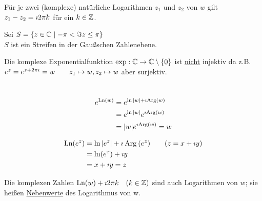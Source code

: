 Für je zwei (komplexe) natürliche Logarithmen $z_1$ und $z_2$ von $w$ gilt $z_1-z_2=\imath 2\pi k$ für ein $k\in\mathbb{Z}$.

Sei $S=\{z\in\mathbb{C}\mid-\pi<\Im z \leq \pi\}$\\
$S$ ist ein Streifen in der Gaußschen Zahlenebene.

\vspace{-0.5cm}

Die komplexe Exponentialfunktion $\exp:\mathbb{C}\to\mathbb{C}\setminus\{0\}$ ist \underline{nicht} injektiv da z.B. $e^z= e^{z+2\pi \imath }=w\qquad z_1\mapsto w, z_2\mapsto w$ aber surjektiv.


\Beweis\quad\\
\begin{align*}
e^{\mathbin\text{Ln}(w)}&=e^{\ln|w|+\imath \mathbin\text{Arg}(w)}\\
&=e^{\ln|w|}e^{\imath \mathbin\text{Arg}(w)}\\
&=|w|e^{\imath \mathbin\text{Arg}(w)}=w
\end{align*}


\begin{align*}
\mathbin\text{Ln}(e^z)&=\ln|e^z|+\imath \mathbin\text{Arg}(e^z)\qquad(z=x+\imath y)\\
&=\ln(e^x)+\imath y\\
&=x+\imath y=z
\end{align*}

\Bem Die komplexen Zahlen $\mathbin\text{Ln}(w)+\imath 2\pi k\quad(k\in\mathbb{Z})$ sind auch Logarithmen von $w$; sie heißen \underline{Nebenwerte} des Logarithmus von w.

